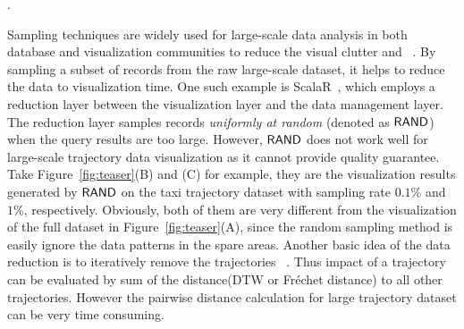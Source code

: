 .

Sampling techniques are widely used for large-scale data analysis in both database and visualization communities to reduce the visual clutter and   ~\cite{qin2020making,DBLP:conf/sigmod/DingHCC016,DBLP:journals/pvldb/KimBPIMR15,park2016visualization}. By sampling a subset of records from the raw large-scale dataset, it helps to reduce the data to visualization time. One such example is ScalaR~\cite{battle2013dynamic}, which employs a reduction layer between the visualization layer and the data management layer. The reduction layer samples records \textit{uniformly at random} (denoted as $\mathsf{RAND}$) when the query results are too large.  
However, $\mathsf{RAND}$ does not work well for large-scale trajectory data visualization as it cannot provide quality guarantee. Take Figure~\ref{fig:teaser}(B) and (C) for example, they are the visualization results generated by $\mathsf{RAND}$ on the \pt{} taxi trajectory dataset with sampling rate $0.1\%$ and $1\%$, respectively. Obviously, both of them are very different from the visualization of the full \pt{} dataset in Figure~\ref{fig:teaser}(A), since the random sampling method is easily ignore the data patterns in the spare areas. Another basic idea of the data reduction is to iteratively remove the trajectories ~\cite{borcan2012improving}. Thus impact of a trajectory can be evaluated by sum of the distance(DTW or Fréchet distance) to all other trajectories. However the pairwise distance calculation for large trajectory dataset can be very time consuming. 



